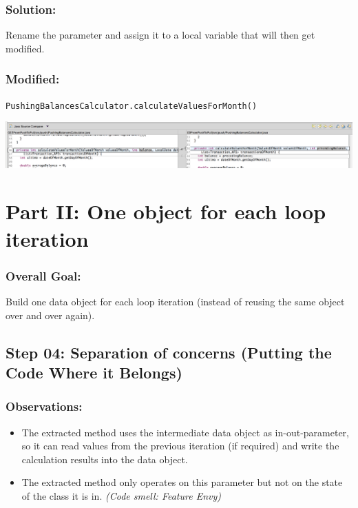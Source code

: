 \documentclass[a4paper,fleqn,titlepage,11pt]{article}
\begin{document}
\subsubsection*{Solution:}

Rename the parameter and assign it to a local variable that will then get modified.

\subsubsection*{Modified:}

\texttt{PushingBalancesCalculator.calculateValuesForMonth()}

\includegraphics[width=1\textwidth]{CompareViews/02Z-03.png}



\clearpage
\section*{Part II: One object for each loop iteration}

\subsubsection*{Overall Goal:}

Build one data object for each loop iteration (instead of reusing the same object over and over again).


\subsection*{Step 04: Separation of concerns (Putting the Code Where it Belongs)}

\subsubsection*{Observations:}
\begin{itemize}
\item The extracted method uses the intermediate data object as in-out-parameter, so it can read values from the previous iteration (if required) and write the calculation results into the data object.
\item The extracted method only operates on this parameter but not on the state of the class it is in. {\em (Code smell: Feature Envy)}
\end{itemize}
\end{document}
